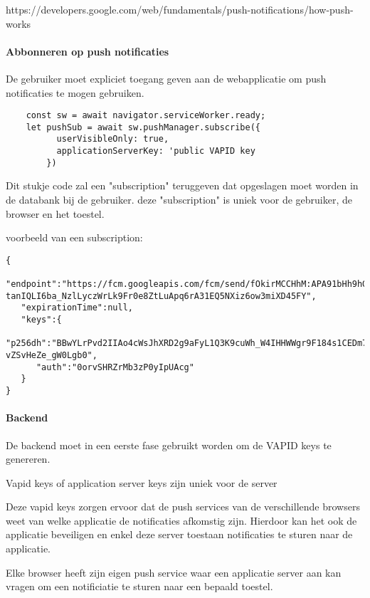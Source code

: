 		https://developers.google.com/web/fundamentals/push-notifications/how-push-works
		
		\paragraph{Abbonneren op push notificaties}
			 De gebruiker moet expliciet toegang geven aan de webapplicatie om push notificaties te mogen gebruiken.
			 
\begin{lstlisting}
    const sw = await navigator.serviceWorker.ready;
    let pushSub = await sw.pushManager.subscribe({
          userVisibleOnly: true,
          applicationServerKey: 'public VAPID key
        })
\end{lstlisting}

			Dit stukje code zal een "subscription" teruggeven dat opgeslagen moet worden in de databank bij de gebruiker. deze "subscription" is uniek voor de gebruiker, de browser en het toestel.
			
			voorbeeld van een subscription:
	
\begin{lstlisting}
{
   "endpoint":"https://fcm.googleapis.com/fcm/send/fOkirMCCHhM:APA91bHh9hG2XiqzvG3w4fhcRUDOlUSAIRwdhyhUEmoiO9CXRjV5LaCrLKvpoyhU8j7KdTqHN6jHLe_I-tanIQLI6ba_NzlLyczWrLk9Fr0e8ZtLuApq6rA31EQ5NXiz6ow3miXD45FY",
   "expirationTime":null,
   "keys":{
      "p256dh":"BBwYLrPvd2IIAo4cWsJhXRD2g9aFyL1Q3K9cuWh_W4IHHWWgr9F184s1CEDm7CgcB6Zg3E-vZSvHeZe_gW0Lgb0",
      "auth":"0orvSHRZrMb3zP0yIpUAcg"
   }
}
\end{lstlisting}


		\paragraph{Backend}
			De backend moet in een eerste fase gebruikt worden om de VAPID keys te genereren.
			
			Vapid keys of application server keys zijn uniek voor de server
			
			Deze vapid keys zorgen ervoor dat de push services van de verschillende browsers weet van welke applicatie de notificaties afkomstig zijn. Hierdoor kan het ook de applicatie beveiligen en enkel deze server toestaan notificaties te sturen naar de applicatie.
			
			Elke browser heeft zijn eigen push service waar een applicatie server aan kan vragen om een notificiatie te sturen naar een bepaald toestel.
			

